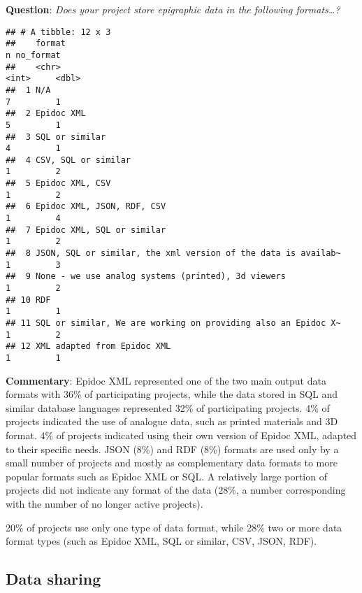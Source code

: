 \documentclass[
]{article}
\begin{document}
\textbf{Question}: \emph{Does your project store epigraphic data in the
following formats\ldots?}

\begin{verbatim}
## # A tibble: 12 x 3
##    format                                                            n no_format
##    <chr>                                                         <int>     <dbl>
##  1 N/A                                                               7         1
##  2 Epidoc XML                                                        5         1
##  3 SQL or similar                                                    4         1
##  4 CSV, SQL or similar                                               1         2
##  5 Epidoc XML, CSV                                                   1         2
##  6 Epidoc XML, JSON, RDF, CSV                                        1         4
##  7 Epidoc XML, SQL or similar                                        1         2
##  8 JSON, SQL or similar, the xml version of the data is availab~     1         3
##  9 None - we use analog systems (printed), 3d viewers                1         2
## 10 RDF                                                               1         1
## 11 SQL or similar, We are working on providing also an Epidoc X~     1         2
## 12 XML adapted from Epidoc XML                                       1         1
\end{verbatim}

\textbf{Commentary}: Epidoc XML represented one of the two main output
data formats with 36\% of participating projects, while the data stored
in SQL and similar database languages represented 32\% of participating
projects. 4\% of projects indicated the use of analogue data, such as
printed materials and 3D format. 4\% of projects indicated using their
own version of Epidoc XML, adapted to their specific needs. JSON (8\%)
and RDF (8\%) formats are used only by a small number of projects and
mostly as complementary data formats to more popular formats such as
Epidoc XML or SQL. A relatively large portion of projects did not
indicate any format of the data (28\%, a number corresponding with the
number of no longer active projects).

20\% of projects use only one type of data format, while 28\% two or
more data format types (such as Epidoc XML, SQL or similar, CSV, JSON,
RDF).

\hypertarget{data-sharing-1}{%
\subsection{Data sharing}\label{data-sharing-1}}
\end{document}
